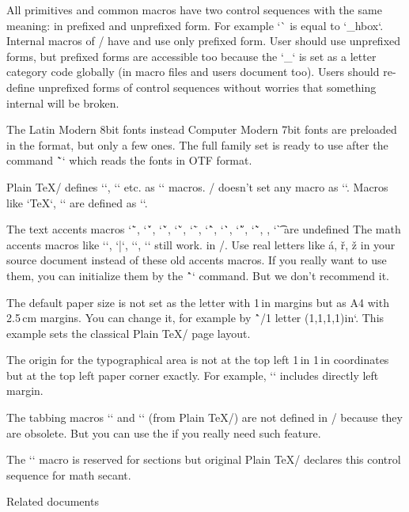 {All primitives and common macros have two
control sequences with the same meaning: in prefixed and unprefixed form.
For example `\hbox` is equal to `\_hbox`.
Internal macros of \OpTeX/ have and use only prefixed form. User should use
unprefixed forms, but prefixed forms are accessible too because the `_` is
set as a letter category code globally (in macro files and users document too). Users
should re-define unprefixed forms of control sequences without worries that
something internal will be broken.

\new
The Latin Modern 8bit fonts instead Computer Modern 7bit fonts are
preloaded in the format, but only a few ones. The full family set is ready to
use after the command \~`\fontfam[LMfonts]` which reads the fonts in OTF
format.

\new
Plain \TeX/ defines `\newcount`, `\bye` etc. as `\outer` macros. \OpTeX/
doesn't set any macro as `\outer`. Macros like `\TeX`, `\rm` are defined as
`\protected`.

\new
The text accents macros `\"`, `\'`, `\v`, `\u`, `\=`, `\^`, `\.`, `\H`,
`\~`, , `\t`   are undefined\fnote
{The math accents macros like `\acute`, `\bar`, `\dot`, `\hat` still work.}
in \OpTeX/. Use real
letters like á, ř, ž in your source document instead of these old accents macros.
If you really want to use them, you can initialize them by the \^`\oldaccents`
command. But we don't recommend it.

\new
The default paper size is not set as the letter with 1\,in margins but as A4 with
2.5\,cm margins. You can change it, for example by
\^`\margins/1 letter (1,1,1,1)in`. This example sets the classical Plain \TeX/
page layout.

\new
The origin for the typographical area is not at the top left 1\,in 1\,in coordinates
but at the top left paper corner exactly. For example, `\hoffset` includes directly left
margin.

The tabbing macros `\settabs` and `\+` (from Plain \TeX/)
are not defined in \OpTeX/ because they are obsolete. But you can use the
if you really need such feature.

The `\sec` macro is reserved for sections but original Plain \TeX/ declares this
control sequence for math secant.

\sec Related documents

}
